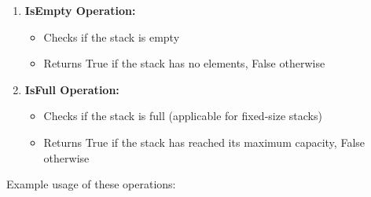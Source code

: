 \begin{enumerate}
\begin{Shaded}
\begin{Highlighting}[]
     
        \NormalTok{ stack[}\OperatorTok{{-}}\NormalTok{]}
    \NormalTok{:}
        \NormalTok{(}\NormalTok{)}
         
\end{Highlighting}
\end{Shaded}
\item
  \textbf{IsEmpty Operation:}

  \begin{itemize}
  \tightlist
  \item
    Checks if the stack is empty
  \item
    Returns True if the stack has no elements, False otherwise
  \end{itemize}

\begin{Shaded}
\begin{Highlighting}[]
     \OperatorTok{==} 
\end{Highlighting}
\end{Shaded}
\item
  \textbf{IsFull Operation:}

  \begin{itemize}
  \tightlist
  \item
    Checks if the stack is full (applicable for fixed-size stacks)
  \item
    Returns True if the stack has reached its maximum capacity, False
    otherwise
  \end{itemize}

\begin{Shaded}
\begin{Highlighting}[]
     \OperatorTok{==}
\end{Highlighting}
\end{Shaded}
\end{enumerate}

Example usage of these operations:

